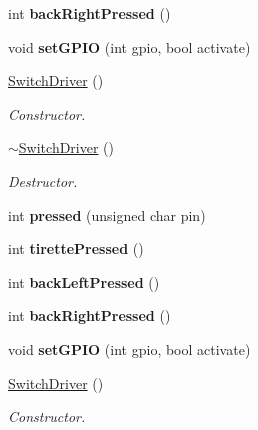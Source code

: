 \begin{DoxyCompactItemize}
int {\bfseries back\+Right\+Pressed} ()
\item 
\mbox{\label{classSwitchDriver_a1523b4e4d6f833ac1fbcb6204104d287}} 
void {\bfseries set\+G\+P\+IO} (int gpio, bool activate)
\item 
\mbox{\label{classSwitchDriver_a318f2cc1988d9ddfae71131fcf39d929}} 
\hyperlink{classSwitchDriver_a318f2cc1988d9ddfae71131fcf39d929}{Switch\+Driver} ()
\begin{DoxyCompactList}\small\item\em Constructor. \end{DoxyCompactList}\item 
\mbox{\label{classSwitchDriver_a8a8cb8dff5ed4c61b9da36389c21dcf8}} 
\hyperlink{classSwitchDriver_a8a8cb8dff5ed4c61b9da36389c21dcf8}{$\sim$\+Switch\+Driver} ()
\begin{DoxyCompactList}\small\item\em Destructor. \end{DoxyCompactList}\item 
\mbox{\label{classSwitchDriver_a379d72f1adda71986eda15ac793e47b2}} 
int {\bfseries pressed} (unsigned char pin)
\item 
\mbox{\label{classSwitchDriver_a1b2f0e72af9da5be2432978f13bf52ca}} 
int {\bfseries tirette\+Pressed} ()
\item 
\mbox{\label{classSwitchDriver_a97cf6ca8501fbd0ca937c366b32ee191}} 
int {\bfseries back\+Left\+Pressed} ()
\item 
\mbox{\label{classSwitchDriver_af20343abbad7e959ce0fadb3c8bdb145}} 
int {\bfseries back\+Right\+Pressed} ()
\item 
\mbox{\label{classSwitchDriver_a1523b4e4d6f833ac1fbcb6204104d287}} 
void {\bfseries set\+G\+P\+IO} (int gpio, bool activate)
\item 
\mbox{\label{classSwitchDriver_a318f2cc1988d9ddfae71131fcf39d929}} 
\hyperlink{classSwitchDriver_a318f2cc1988d9ddfae71131fcf39d929}{Switch\+Driver} ()
\begin{DoxyCompactList}\small\item\em Constructor. \end{DoxyCompactList}\item 

\end{DoxyCompactItemize}
